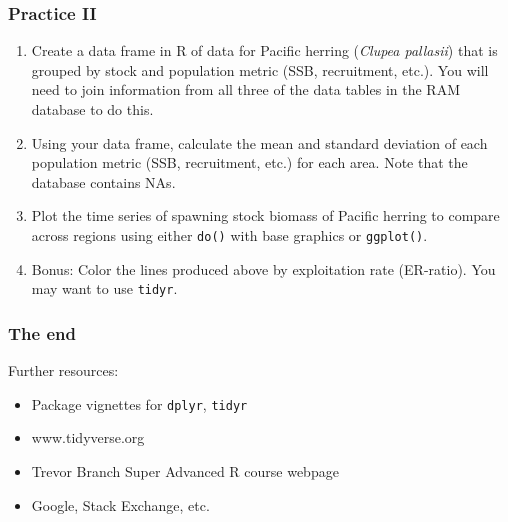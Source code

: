 \documentclass{beamer}\usepackage[]{graphicx}\usepackage[]{color}
\makeatletter
\newcommand{\hlstr}[1]{\textcolor[rgb]{0.192,0.494,0.8}{#1}}%
\newcommand{\hlopt}[1]{\textcolor[rgb]{0,0,0}{#1}}%
\newcommand{\hlstd}[1]{\textcolor[rgb]{0.345,0.345,0.345}{#1}}%
\newcommand{\hlkwb}[1]{\textcolor[rgb]{0.69,0.353,0.396}{#1}}%
\newcommand{\hlkwc}[1]{\textcolor[rgb]{0.333,0.667,0.333}{#1}}%
\newcommand{\hlkwd}[1]{\textcolor[rgb]{0.737,0.353,0.396}{\textbf{#1}}}%
\newenvironment{kframe}{%
 \def\at@end@of@kframe{}%
 \ifinner\ifhmode%
  \def\at@end@of@kframe{\end{minipage}}%
  \begin{minipage}{\columnwidth}%
 \fi\fi%
 \def\FrameCommand##1{\hskip\@totalleftmargin \hskip-\fboxsep
 \colorbox{shadecolor}{##1}\hskip-\fboxsep
     \hskip-\linewidth \hskip-\@totalleftmargin \hskip\columnwidth}%
 \MakeFramed {\advance\hsize-\width
   \@totalleftmargin\z@ \linewidth\hsize
   \@setminipage}}%
 {\par\unskip\endMakeFramed%
 \at@end@of@kframe}
\newenvironment{knitrout}{}{} %
\makeatother
\begin{document}
 
\begin{frame}
  \frametitle{Practice II}
  \begin{enumerate}
    \item Create a data frame in R of data for Pacific herring (\textit{Clupea pallasii}) that is grouped by stock and population metric (SSB, recruitment, etc.). You will need to join information from all three of the data tables in the RAM database to do this.
    \item Using your data frame, calculate the mean and standard deviation of each population metric (SSB, recruitment, etc.) for each area. Note that the database contains NAs.
    \item Plot the time series of spawning stock biomass of Pacific herring to compare across regions using either \texttt{do()} with base graphics or \texttt{ggplot()}.
    \item Bonus: Color the lines produced above by exploitation rate (ER-ratio). You may want to use \texttt{tidyr}.
  \end{enumerate}
\end{frame}



\begin{frame}
  \frametitle{The end}
  Further resources:
    \begin{itemize}
      \item Package vignettes for \texttt{dplyr}, \texttt{tidyr}
      \item www.tidyverse.org
      \item Trevor Branch Super Advanced R course webpage
      \item Google, Stack Exchange, etc.
    \end{itemize}
\end{frame}
\end{document}
